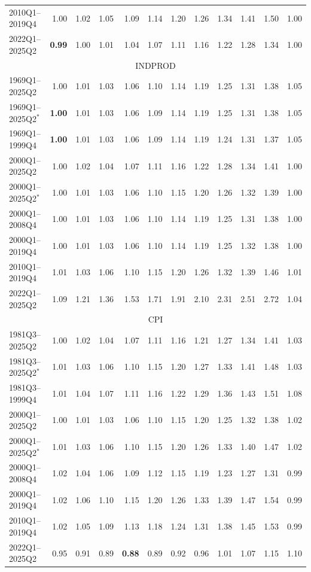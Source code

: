 \begin{tabular}{lrrrrrrrrrrr}
2010Q1--2019Q4 & 1.00 & 1.02 & 1.05 & 1.09 & 1.14 & 1.20 & 1.26 & 1.34 & 1.41 & 1.50 & 1.00 \\
2022Q1--2025Q2 & \textbf{0.99} & 1.00 & 1.01 & 1.04 & 1.07 & 1.11 & 1.16 & 1.22 & 1.28 & 1.34 & 1.00 \\
\hline
\multicolumn{12}{c}{INDPROD} \\
1969Q1--2025Q2 & 1.00 & 1.01 & 1.03 & 1.06 & 1.10 & 1.14 & 1.19 & 1.25 & 1.31 & 1.38 & 1.05 \\
1969Q1--2025Q2$^*$ & \textbf{1.00} & 1.01 & 1.03 & 1.06 & 1.09 & 1.14 & 1.19 & 1.25 & 1.31 & 1.38 & 1.05 \\
1969Q1--1999Q4 & \textbf{1.00} & 1.01 & 1.03 & 1.06 & 1.09 & 1.14 & 1.19 & 1.24 & 1.31 & 1.37 & 1.05 \\
2000Q1--2025Q2 & 1.00 & 1.02 & 1.04 & 1.07 & 1.11 & 1.16 & 1.22 & 1.28 & 1.34 & 1.41 & 1.00 \\
2000Q1--2025Q2$^*$ & 1.00 & 1.01 & 1.03 & 1.06 & 1.10 & 1.15 & 1.20 & 1.26 & 1.32 & 1.39 & 1.00 \\
2000Q1--2008Q4 & 1.00 & 1.01 & 1.03 & 1.06 & 1.10 & 1.14 & 1.19 & 1.25 & 1.31 & 1.38 & 1.00 \\
2000Q1--2019Q4 & 1.00 & 1.01 & 1.03 & 1.06 & 1.10 & 1.14 & 1.19 & 1.25 & 1.32 & 1.38 & 1.00 \\
2010Q1--2019Q4 & 1.01 & 1.03 & 1.06 & 1.10 & 1.15 & 1.20 & 1.26 & 1.32 & 1.39 & 1.46 & 1.01 \\
2022Q1--2025Q2 & 1.09 & 1.21 & 1.36 & 1.53 & 1.71 & 1.91 & 2.10 & 2.31 & 2.51 & 2.72 & 1.04 \\
\hline
\multicolumn{12}{c}{CPI} \\
1981Q3--2025Q2 & 1.00 & 1.02 & 1.04 & 1.07 & 1.11 & 1.16 & 1.21 & 1.27 & 1.34 & 1.41 & 1.03 \\
1981Q3--2025Q2$^*$ & 1.01 & 1.03 & 1.06 & 1.10 & 1.15 & 1.20 & 1.27 & 1.33 & 1.41 & 1.48 & 1.03 \\
1981Q3--1999Q4 & 1.01 & 1.04 & 1.07 & 1.11 & 1.16 & 1.22 & 1.29 & 1.36 & 1.43 & 1.51 & 1.08 \\
2000Q1--2025Q2 & 1.00 & 1.01 & 1.03 & 1.06 & 1.10 & 1.15 & 1.20 & 1.25 & 1.32 & 1.38 & 1.02 \\
2000Q1--2025Q2$^*$ & 1.01 & 1.03 & 1.06 & 1.10 & 1.15 & 1.20 & 1.26 & 1.33 & 1.40 & 1.47 & 1.02 \\
2000Q1--2008Q4 & 1.02 & 1.04 & 1.06 & 1.09 & 1.12 & 1.15 & 1.19 & 1.23 & 1.27 & 1.31 & 0.99 \\
2000Q1--2019Q4 & 1.02 & 1.06 & 1.10 & 1.15 & 1.20 & 1.26 & 1.33 & 1.39 & 1.47 & 1.54 & 0.99 \\
2010Q1--2019Q4 & 1.02 & 1.05 & 1.09 & 1.13 & 1.18 & 1.24 & 1.31 & 1.38 & 1.45 & 1.53 & 0.99 \\
2022Q1--2025Q2 & 0.95 & 0.91 & 0.89 & \textbf{0.88} & 0.89 & 0.92 & 0.96 & 1.01 & 1.07 & 1.15 & 1.10 \\
\hline
\end{tabular}
